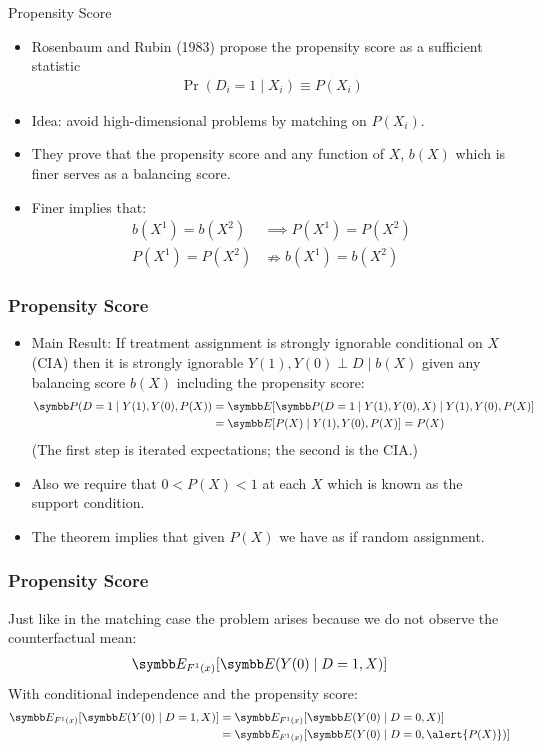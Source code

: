 \documentclass[aspectratio=169,11pt]{beamer}
\begin{document}
\begin{frame}{Propensity Score}
\begin{itemize}
\item Rosenbaum and Rubin (1983) propose the \alert{propensity score} as a sufficient statistic
\begin{align*}
\Pr(D_i  = 1 \mid X_i) \equiv P(X_i)
\end{align*}
\item Idea: avoid high-dimensional problems by matching on $P(X_i)$.
\item They prove that the propensity score and any function of $X$, $b(X)$ which is finer serves as a \alert{balancing score}.
\item Finer implies that:
\begin{align*}
b(X^1) = b(X^2) &\implies P(X^1) = P(X^2)\\
P(X^1) = P(X^2) & \nRightarrow  b(X^1) = b(X^2)
\end{align*}
\end{itemize}
\end{frame}


\begin{frame}
\frametitle{Propensity Score}
\begin{itemize}
\item Main Result: If treatment assignment is strongly ignorable conditional on $X$ (CIA) then it is strongly ignorable $Y(1),Y(0) \perp D \mid b(X)$ given any balancing score $b(X)$ including the propensity score:
\begin{align*}
\Pr(D=1 \mid Y(1), Y(0),P(X))&= \E[\Pr(D=1\mid Y(1),Y(0),X) \mid Y(1),Y(0),P(X)] \\
&= \E[P(X) \mid Y(1),Y(0),P(X) ] = P(X)
\end{align*}
(The first step is iterated expectations; the second is the CIA.)
\item Also we require that $0 < P(X) < 1$ at each $X$ which is known as the \alert{support condition}.
\item The theorem implies that given $P(X)$ we have as if random assignment.
\end{itemize}
\end{frame}


\begin{frame}
\frametitle{Propensity Score}
Just like in the matching case the problem arises because we do not observe the counterfactual mean:
\begin{align*}
 \E_{F^1(x)} [\E(Y(0) \mid D=1,X)] 
\end{align*}
With conditional independence and the propensity score:
\begin{align*}
 \E_{F^1(x)} [\E(Y(0) \mid D=1,X)]  &=  \E_{F^1(x)} [\E(Y(0) \mid D=0,X)] \\
 &=  \E_{F^1(x)} [\E(Y(0) \mid D=0, \alert{P(X)})] 
\end{align*}
\end{frame}
\end{document}
